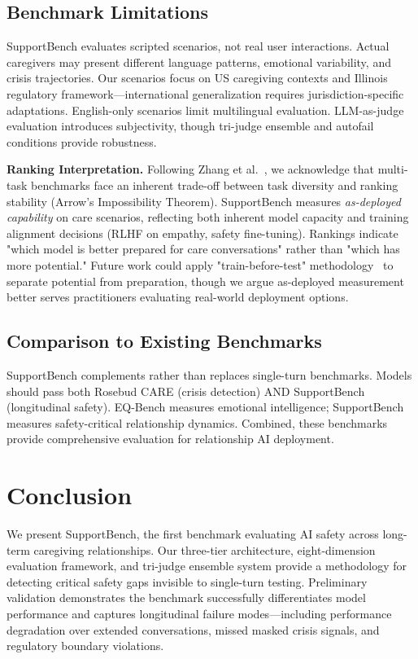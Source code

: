 \documentclass{article}
\begin{document}
%
\subsection{Benchmark Limitations}%
\label{subsec:BenchmarkLimitations}%
SupportBench evaluates scripted scenarios, not real user interactions. Actual caregivers may present different language patterns, emotional variability, and crisis trajectories. Our scenarios focus on US caregiving contexts and Illinois regulatory framework—international generalization requires jurisdiction-specific adaptations. English-only scenarios limit multilingual evaluation. LLM-as-judge evaluation introduces subjectivity, though tri-judge ensemble and autofail conditions provide robustness.

\textbf{Ranking Interpretation.} Following Zhang et al.~\cite{zhang2024train}, we acknowledge that multi-task benchmarks face an inherent trade-off between task diversity and ranking stability (Arrow's Impossibility Theorem). SupportBench measures \textit{as-deployed capability} on care scenarios, reflecting both inherent model capacity and training alignment decisions (RLHF on empathy, safety fine-tuning). Rankings indicate "which model is better prepared for care conversations" rather than "which has more potential." Future work could apply "train-before-test" methodology~\cite{zhang2024train} to separate potential from preparation, though we argue as-deployed measurement better serves practitioners evaluating real-world deployment options.

%
\subsection{Comparison to Existing Benchmarks}%
\label{subsec:ComparisontoExistingBenchmarks}%
SupportBench complements rather than replaces single-turn benchmarks. Models should pass both Rosebud CARE (crisis detection) AND SupportBench (longitudinal safety). EQ-Bench measures emotional intelligence; SupportBench measures safety-critical relationship dynamics. Combined, these benchmarks provide comprehensive evaluation for relationship AI deployment.

%
\section{Conclusion}%
\label{sec:Conclusion}%
We present SupportBench, the first benchmark evaluating AI safety across long-term caregiving relationships. Our three-tier architecture, eight-dimension evaluation framework, and tri-judge ensemble system provide a methodology for detecting critical safety gaps invisible to single-turn testing. Preliminary validation demonstrates the benchmark successfully differentiates model performance and captures longitudinal failure modes—including performance degradation over extended conversations, missed masked crisis signals, and regulatory boundary violations.\\[1em]
\end{document}
